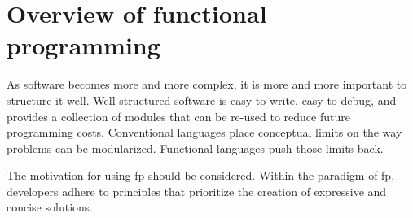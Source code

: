 \chapter{Overview of functional programming}\label{chap:functional-programming}
\begin{shaded}
    \noindent
    \glqq{}As software becomes more and more complex, it is more and more important to structure it well. Well-structured software is easy to write, easy to debug, and provides a collection of modules that can be re-used to reduce future programming costs. Conventional languages place conceptual limits on the way problems can be modularized. Functional languages push those limits back.\grqq{}\ \cite{Hughes1989}
\end{shaded}

The motivation for using \ac{fp} should be considered. Within the paradigm of \ac{fp}, developers adhere to principles that prioritize the creation of expressive and concise solutions.
    
